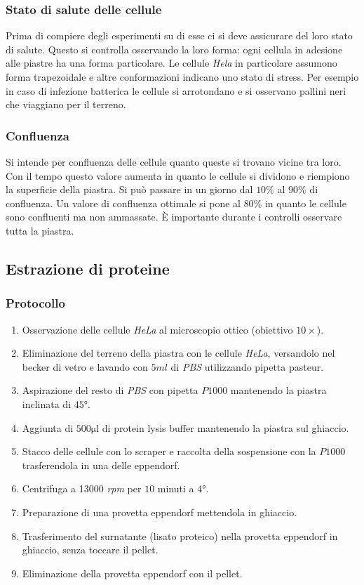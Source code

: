 		\subsubsection{Stato di salute delle cellule}
		Prima di compiere degli esperimenti su di esse ci si deve assicurare del loro stato di salute. 
		Questo si controlla osservando la loro forma: ogni cellula in adesione alle piastre ha una forma particolare.
		Le cellule \emph{Hela} in particolare assumono forma trapezoidale e altre conformazioni indicano uno stato di stress.
		Per esempio in caso di infezione batterica le cellule si arrotondano e si osservano pallini neri che viaggiano per il terreno. 
		
		\subsubsection{Confluenza}
		Si intende per confluenza delle cellule quanto queste si trovano vicine tra loro. 
		Con il tempo questo valore aumenta in quanto le cellule si dividono e riempiono la superficie della piastra.
		Si pu\`o passare in un giorno dal $10\%$ al $90\%$ di confluenza.
		Un valore di confluenza ottimale si pone al $80\%$ in quanto le cellule sono confluenti ma non ammassate.
		\`E importante durante i controlli osservare tutta la piastra.


	\subsection{Estrazione di proteine}

		\subsubsection{Protocollo}
		\begin{multicols}{2}
		\begin{enumerate}
			\item Osservazione delle cellule \emph{HeLa} al microscopio ottico (obiettivo $10\times$).
			\item Eliminazione del terreno della piastra con le cellule \emph{HeLa}, versandolo nel becker di vetro e lavando con $5\si{ml}$ di \emph{PBS} utilizzando pipetta pasteur.
			\item Aspirazione del resto di \emph{PBS} con pipetta $P1000$ mantenendo la piastra inclinata di $45\si{\degree}$.
			\item Aggiunta di $500\si{\micro\litre}$ di protein lysis buffer mantenendo la piastra sul ghiaccio.
			\item Stacco delle cellule con lo scraper e raccolta della sospensione con la $P1000$ trasferendola in una delle eppendorf.
			\item Centrifuga a \num{13000} \emph{rpm} per $10$ minuti a $4\si{\degree}$.
			\item Preparazione di una provetta eppendorf mettendola in ghiaccio.
			\item Trasferimento del surnatante (lisato proteico) nella provetta eppendorf in ghiaccio, senza toccare il pellet.
			\item Eliminazione della provetta eppendorf con il pellet.
		\end{enumerate}
	\end{multicols}

